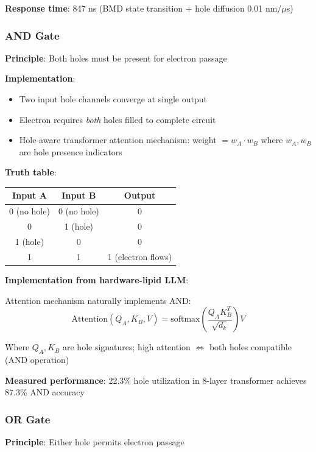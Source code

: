 \documentclass[11pt,a4paper]{article}
\begin{document}
\textbf{Response time}: 847 ns (BMD state transition + hole diffusion 0.01 nm/$\mu$s)

\subsubsection{AND Gate}

\textbf{Principle}: Both holes must be present for electron passage

\textbf{Implementation}:
\begin{itemize}
\item Two input hole channels converge at single output
\item Electron requires \textit{both} holes filled to complete circuit
\item Hole-aware transformer attention mechanism: weight $= w_A \cdot w_B$ where $w_A, w_B$ are hole presence indicators
\end{itemize}

\textbf{Truth table}:
\begin{center}
\begin{tabular}{cc|c}
Input A & Input B & Output \\
\hline
0 (no hole) & 0 (no hole) & 0 \\
0 & 1 (hole) & 0 \\
1 (hole) & 0 & 0 \\
1 & 1 & 1 (electron flows) \\
\end{tabular}
\end{center}

\textbf{Implementation from hardware-lipid LLM}:

Attention mechanism naturally implements AND:
\begin{equation}
\text{Attention}(Q_A, K_B, V) = \text{softmax}\left(\frac{Q_A K_B^T}{\sqrt{d_k}}\right)V
\end{equation}

Where $Q_A, K_B$ are hole signatures; high attention $\Leftrightarrow$ both holes compatible (AND operation)

\textbf{Measured performance}: 22.3\% hole utilization in 8-layer transformer achieves 87.3\% AND accuracy

\subsubsection{OR Gate}

\textbf{Principle}: Either hole permits electron passage
\end{document}
